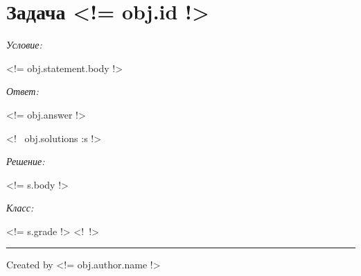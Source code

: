 \documentclass[<!= f.optionsToString(f.documentClassOptions(pars)) !>]{article}
\newcommand{\tmp}[1]{\noindent\par\textit{#1: }\nopagebreak\par}
\begin{document}
    \section{Задача \textnumero <!= obj.id !>}
    \tmp{Условие}
        <!= obj.statement.body !>
    \tmp{Ответ}
        <!= obj.answer !>

    <!~ obj.solutions :s !>
    \tmp{Решение}
        <!= s.body !>
    \tmp{Класс}
        <!= s.grade !>
    <!~!>

    \noindent\rule{\textwidth}{0.2pt}
    Created by <!= obj.author.name !>
\end{document}
